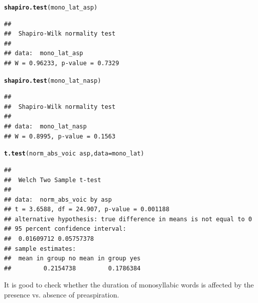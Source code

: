 \documentclass[a4paper,11pt]{article}\usepackage[]{graphicx}\usepackage[]{color}
\makeatletter
\newcommand{\hlopt}[1]{\textcolor[rgb]{0,0,0}{#1}}%
\newcommand{\hlstd}[1]{\textcolor[rgb]{0.345,0.345,0.345}{#1}}%
\newcommand{\hlkwc}[1]{\textcolor[rgb]{0.333,0.667,0.333}{#1}}%
\newcommand{\hlkwd}[1]{\textcolor[rgb]{0.737,0.353,0.396}{\textbf{#1}}}%
\newenvironment{kframe}{%
 \def\at@end@of@kframe{}%
 \ifinner\ifhmode%
  \def\at@end@of@kframe{\end{minipage}}%
  \begin{minipage}{\columnwidth}%
 \fi\fi%
 \def\FrameCommand##1{\hskip\@totalleftmargin \hskip-\fboxsep
 \colorbox{shadecolor}{##1}\hskip-\fboxsep
     \hskip-\linewidth \hskip-\@totalleftmargin \hskip\columnwidth}%
 \MakeFramed {\advance\hsize-\width
   \@totalleftmargin\z@ \linewidth\hsize
   \@setminipage}}%
 {\par\unskip\endMakeFramed%
 \at@end@of@kframe}
\newenvironment{knitrout}{}{} %
\makeatother
\begin{document}
\begin{knitrout}
\color{fgcolor}\begin{kframe}
\begin{alltt}
\hlkwd{shapiro.test}\hlstd{(mono_lat_asp)}
\end{alltt}
\begin{verbatim}
## 
## 	Shapiro-Wilk normality test
## 
## data:  mono_lat_asp
## W = 0.96233, p-value = 0.7329
\end{verbatim}
\begin{alltt}
\hlkwd{shapiro.test}\hlstd{(mono_lat_nasp)}
\end{alltt}
\begin{verbatim}
## 
## 	Shapiro-Wilk normality test
## 
## data:  mono_lat_nasp
## W = 0.8995, p-value = 0.1563
\end{verbatim}
\begin{alltt}
\hlkwd{t.test}\hlstd{(norm_abs_voic} \hlopt{~} \hlstd{asp,} \hlkwc{data} \hlstd{= mono_lat)}
\end{alltt}
\begin{verbatim}
## 
## 	Welch Two Sample t-test
## 
## data:  norm_abs_voic by asp
## t = 3.6588, df = 24.907, p-value = 0.001188
## alternative hypothesis: true difference in means is not equal to 0
## 95 percent confidence interval:
##  0.01609712 0.05757378
## sample estimates:
##  mean in group no mean in group yes 
##         0.2154738         0.1786384
\end{verbatim}
\end{kframe}
\end{knitrout}

It is good to check whether the duration of monosyllabic words is affected by the presence vs. absence of preaspiration.
\end{document}
